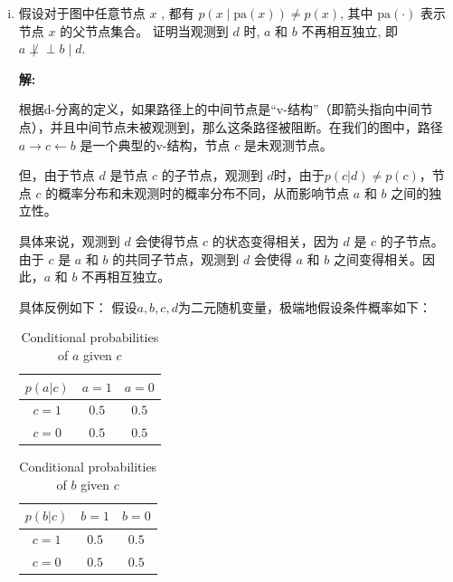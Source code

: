 \documentclass[8pt]{article}
\begin{document}
\begin{enumerate}[(i)]
        \item 
        假设对于图中任意节点 $x$ , 都有 $p(x \mid \text{pa}(x)) \neq p(x)$, 其中 $\text{pa}(\cdot)$ 表示节点 $x$ 的父节点集合。
        证明当观测到 $d$ 时, $a$ 和 $b$ 不再相互独立, 即 \(a \not\perp\!\!\!\perp b \mid d\). 
        
        \textbf{\large 解:}
        
        根据d-分离的定义，如果路径上的中间节点是“v-结构”（即箭头指向中间节点），并且中间节点未被观测到，那么这条路径被阻断。在我们的图中，路径 $a \rightarrow c \leftarrow b$ 是一个典型的v-结构，节点 $c$ 是未观测节点。

        但，由于节点 $d$ 是节点 $c$ 的子节点，观测到 $d$时，由于$p(c|d)\not= p(c)$，节点 $c$ 的概率分布和未观测时的概率分布不同，从而影响节点 $a$ 和 $b$ 之间的独立性。
        
        具体来说，观测到 $d$ 会使得节点 $c$ 的状态变得相关，因为 $d$ 是 $c$ 的子节点。由于 $c$ 是 $a$ 和 $b$ 的共同子节点，观测到 $d$ 会使得 $a$ 和 $b$ 之间变得相关。因此，$a$ 和 $b$ 不再相互独立。
        
        具体反例如下：
        假设$a,b,c,d$为二元随机变量，极端地假设条件概率如下：
        \begin{table}[H]
            \centering
            \begin{tabular}{|c|c|c|}
                \hline
                $p(a|c)$ & $a=1$ & $a=0$ \\
                \hline
                $c=1$ & $0.5$ & $0.5$ \\
                \hline
                $c=0$ & $0.5$ & $0.5$ \\
                \hline
            \end{tabular}
            \caption{Conditional probabilities of $a$ given $c$}
        \end{table}
        
        \begin{table}[H]
            \centering
            \begin{tabular}{|c|c|c|}
                \hline
                $p(b|c)$ & $b=1$ & $b=0$ \\
                \hline
                $c=1$ & $0.5$ & $0.5$ \\
                \hline
                $c=0$ & $0.5$ & $0.5$ \\
                \hline
            \end{tabular}
            \caption{Conditional probabilities of $b$ given $c$}
        \end{table}
        

\end{enumerate}
\end{document}
